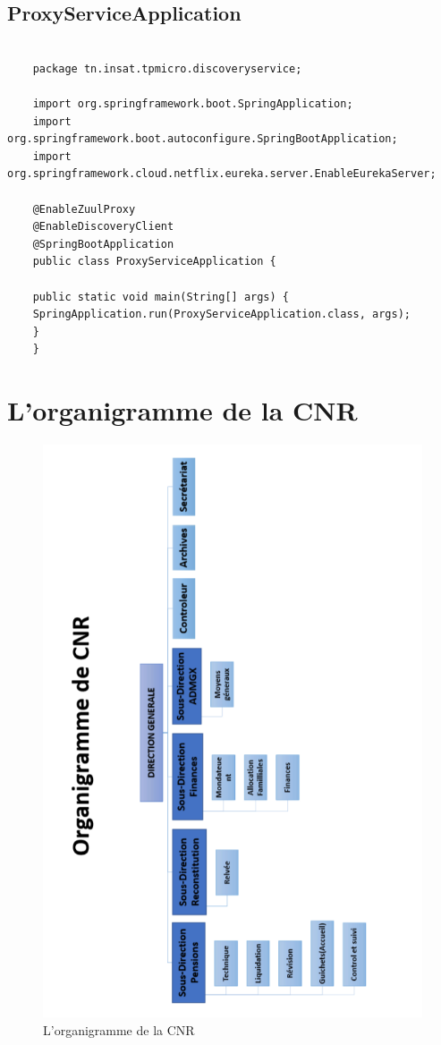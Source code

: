              \section*{ProxyServiceApplication }
    \begin{lstlisting}
    
    package tn.insat.tpmicro.discoveryservice;
    
    import org.springframework.boot.SpringApplication;
    import org.springframework.boot.autoconfigure.SpringBootApplication;
    import org.springframework.cloud.netflix.eureka.server.EnableEurekaServer;
    
    @EnableZuulProxy
    @EnableDiscoveryClient
    @SpringBootApplication
    public class ProxyServiceApplication {
    
    public static void main(String[] args) {
    SpringApplication.run(ProxyServiceApplication.class, args);
    }
    }    \end{lstlisting}  
    
    
    
    
    
    
    
    
    
    
  \chapter{L'organigramme de la CNR}
    
\begin{figure}[H]
	\centering
	\includegraphics[width=1.1\linewidth,height=0.568\paperheight]{images/orgpdf}
	\caption{L'organigramme de la CNR}
	\label{fig:orgpdf}
\end{figure}
